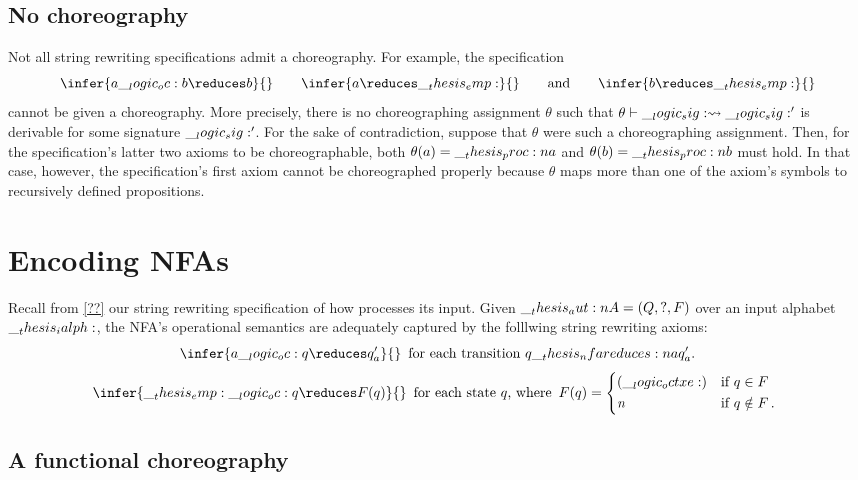 \subsection{No choreography}

Not all string rewriting specifications admit a choreography.
For example, the specification
\begin{equation*}
  \infer{a \oc b \reduces b}{}
  \qquad
  \infer{a \reduces \emp}{}
  \qquad\text{and}\qquad
  \infer{b \reduces \emp}{}
\end{equation*}
cannot be given a choreography.
More precisely, there is no choreographing assignment $\theta$ such that $\theta \vdash \__logic_sig: \rightsquigarrow \__logic_sig:'$ is derivable for some signature $\__logic_sig:'$.
For the sake of contradiction, suppose that $\theta$ were such a choreographing assignment.
Then, for the specification's latter two axioms to be choreographable, both $\theta(a) = \__thesis_proc:n {a}$ and $\theta(b) = \__thesis_proc:n {b}$ must hold.
In that case, however, the specification's first axiom cannot be choreographed properly because $\theta$ maps more than one of the axiom's symbols to recursively defined propositions.


\section{Encoding \aclp*{NFA}}

Recall from \cref{??} our string rewriting specification of how  processes its input.
Given  $\__thesis_aut:n {A} = (Q, ?, F)$ over an input alphabet $\__thesis_ialph:$, the \ac{NFA}'s operational semantics are adequately captured by the folllwing string rewriting axioms:
\begin{equation*}
  \infer{a \oc q \reduces q'_a}{}
  \enspace\text{for each transition $q \nfareduces[a] q'_a$.}
\end{equation*}
\begin{equation*}
  \infer{\emp \oc q \reduces F(q)}{}
  \enspace\text{for each state $q$, where}\enspace
  F(q) = \begin{cases*}
           (\octxe) & if $q \in F$ \\
           \symrej & if $q \notin F$\,.
         \end{cases*}
\end{equation*}

\subsection{A functional choreography}

